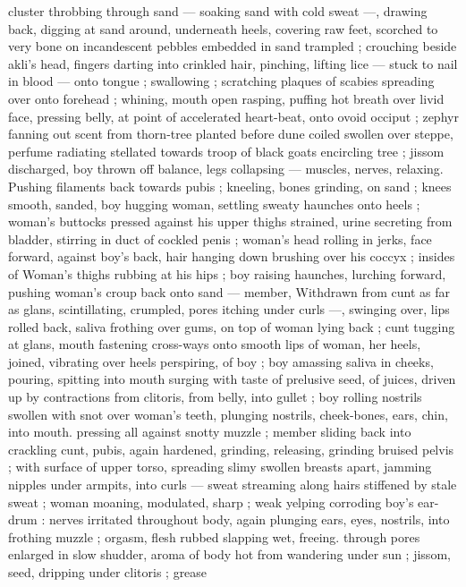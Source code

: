 {cluster throbbing through sand --- soaking sand with cold sweat ---, 
drawing back, digging at sand around, underneath heels, covering 
raw feet, scorched to very bone on incandescent pebbles embedded 
in sand trampled ; crouching beside akli's head, fingers darting into 
crinkled hair, pinching, lifting lice --- stuck to nail in blood --- onto 
tongue ; swallowing ; scratching plaques of scabies spreading over 
onto forehead ; whining, mouth open rasping, puffing hot breath 
over livid face, pressing belly, at point of accelerated heart-beat, 
onto ovoid occiput ; zephyr fanning out scent from thorn-tree planted 
before dune coiled swollen over steppe, perfume radiating stellated 
towards troop of black goats encircling tree ; jissom discharged, boy 
thrown off balance, legs collapsing --- muscles, nerves, relaxing. 
Pushing filaments back towards pubis ; kneeling, bones grinding, on 
sand ; knees smooth, sanded, boy hugging woman, settling sweaty 
haunches onto heels ; woman's buttocks pressed against his upper 
thighs strained, urine secreting from bladder, stirring in duct of 
cockled penis ; woman's head rolling in jerks, face forward, against 
boy's back, hair hanging down brushing over his coccyx ; insides of 
Woman's thighs rubbing at his hips ; boy raising haunches, lurching 
forward, pushing woman's croup back onto sand --- member, 
Withdrawn from cunt as far as glans, scintillating, crumpled, pores 
itching under curls ---, swinging over, lips rolled back, saliva frothing 
over gums, on top of woman lying back ; cunt tugging at glans, 
mouth fastening cross-ways onto smooth lips of woman, her heels, 
joined, vibrating over heels perspiring, of boy ; boy amassing saliva 
in cheeks, pouring, spitting into mouth surging with taste of 
prelusive seed, of juices, driven up by contractions from clitoris, from 
belly, into gullet ; boy rolling nostrils swollen with snot over woman's 
teeth, plunging nostrils, cheek-bones, ears, chin, into mouth. 
pressing all against snotty muzzle ; member sliding back into 
crackling cunt, pubis, again hardened, grinding, releasing, grinding 
bruised pelvis ; with surface of upper torso, spreading slimy swollen 
breasts apart, jamming nipples under armpits, into curls --- sweat 
streaming along hairs stiffened by stale sweat ; woman moaning, 
modulated, sharp ; weak yelping corroding boy's ear-drum : nerves 
irritated throughout body, again plunging ears, eyes, nostrils, into 
frothing muzzle ; orgasm, flesh rubbed slapping wet, freeing. 
through pores enlarged in slow shudder, aroma of body hot from 
wandering under sun ; jissom, seed, dripping under clitoris ; grease 
}
